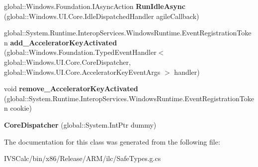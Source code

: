 \begin{DoxyCompactItemize}
\item 
\mbox{\label{class_windows_1_1_u_i_1_1_core_1_1_core_dispatcher_ae1d81c29e61aa9d3e601781f291624c6}} 
global\+::\+Windows.\+Foundation.\+I\+Async\+Action {\bfseries Run\+Idle\+Async} (global\+::\+Windows.\+U\+I.\+Core.\+Idle\+Dispatched\+Handler agile\+Callback)
\item 
\mbox{\label{class_windows_1_1_u_i_1_1_core_1_1_core_dispatcher_ae59e989cb2be9847e256c8717dcf0763}} 
global\+::\+System.\+Runtime.\+Interop\+Services.\+Windows\+Runtime.\+Event\+Registration\+Token {\bfseries add\+\_\+\+Accelerator\+Key\+Activated} (global\+::\+Windows.\+Foundation.\+Typed\+Event\+Handler$<$ global\+::\+Windows.\+U\+I.\+Core.\+Core\+Dispatcher, global\+::\+Windows.\+U\+I.\+Core.\+Accelerator\+Key\+Event\+Args $>$ handler)
\item 
\mbox{\label{class_windows_1_1_u_i_1_1_core_1_1_core_dispatcher_a96732786d7ff5dad968e1ed05e297c99}} 
void {\bfseries remove\+\_\+\+Accelerator\+Key\+Activated} (global\+::\+System.\+Runtime.\+Interop\+Services.\+Windows\+Runtime.\+Event\+Registration\+Token cookie)
\item 
\mbox{\label{class_windows_1_1_u_i_1_1_core_1_1_core_dispatcher_a88a12a752cb9f80bb154d5d4f57d0d75}} 
{\bfseries Core\+Dispatcher} (global\+::\+System.\+Int\+Ptr dummy)
\end{DoxyCompactItemize}


The documentation for this class was generated from the following file\+:\begin{DoxyCompactItemize}
\item 
I\+V\+S\+Calc/bin/x86/\+Release/\+A\+R\+M/ilc/Safe\+Types.\+g.\+cs\end{DoxyCompactItemize}
